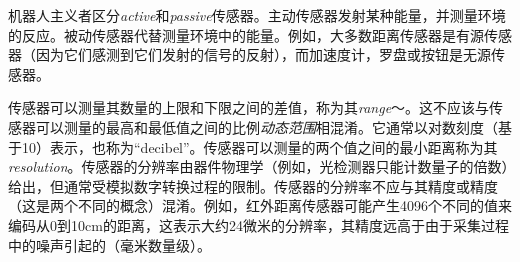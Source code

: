 


机器人主义者区分\emph{active}和\emph{passive}传感器。主动传感器发射某种能量，并测量环境的反应。被动传感器代替测量环境中的能量。例如，大多数距离传感器是有源传感器（因为它们感测到它们发射的信号的反射），而加速度计，罗盘或按钮是无源传感器。

传感器可以测量其数量的上限和下限之间的差值，称为其\emph{range}〜。这不应该与传感器可以测量的最高和最低值之间的比例\emph{动态范围}相混淆。它通常以对数刻度（基于10）表示，也称为“decibel”。传感器可以测量的两个值之间的最小距离称为其\emph{resolution}。传感器的分辨率由器件物理学（例如，光检测器只能计数量子的倍数）给出，但通常受模拟数字转换过程的限制。传感器的分辨率不应与其精度或精度（这是两个不同的概念）混淆。例如，红外距离传感器可能产生4096个不同的值来编码从0到10cm的距离，这表示大约24微米的分辨率，其精度远高于由于采集过程中的噪声引起的（毫米数量级）。


